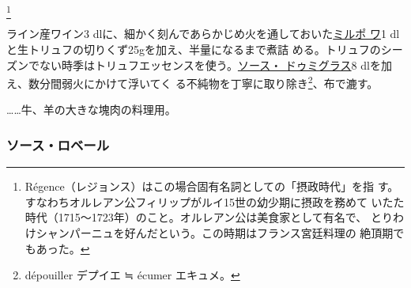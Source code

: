 \begin{recette}
\footnote{Régence（レジョンス）はこの場合固有名詞としての「摂政時代」を指
  す。すなわちオルレアン公フィリップがルイ15世の幼少期に摂政を務めて
  いたた時代（1715〜1723年）のこと。オルレアン公は美食家として有名で、
  とりわけシャンパーニュを好んだという。この時期はフランス宮廷料理の
  絶頂期でもあった。}


ライン産ワイン3
dlに、細かく刻んであらかじめ火を通しておいた\protect\hyperlink{mirepoix}{ミルポ
ワ}1 dlと生トリュフの切りくず25gを加え、半量になるまで煮詰
める。トリュフのシーズンでない時季はトリュフエッセンスを使う。\protect\hyperlink{sauce-demi-glace}{ソース・
ドゥミグラス}8 dlを加え、数分間弱火にかけて浮いてく
る不純物を丁寧に取り除き\footnote{dépouiller デプイエ ≒ écumer
  エキュメ。}、布で漉す。

\ldots{}\ldots{}牛、羊の大きな塊肉の料理用。

\hypertarget{sauce-robert}{%
\subsubsection{ソース・ロベール}\label{sauce-robert}}


\end{recette}
